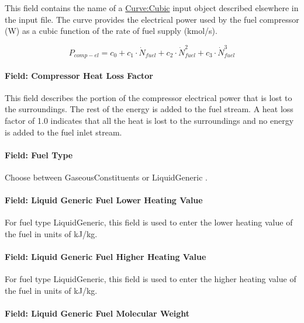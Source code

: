 This field contains the name of a \hyperref[curvecubic]{Curve:Cubic} input object described elsewhere in the input file. The curve provides the electrical power used by the fuel compressor (W) as a cubic function of the rate of fuel supply (kmol/s).

\begin{equation}
{P_{comp - el}} = {c_0} + {c_1} \cdot {\dot N_{fuel}} + {c_2} \cdot \dot N_{fuel}^2 + {c_3} \cdot \dot N_{fuel}^3
\end{equation}

\paragraph{Field: Compressor Heat Loss Factor}\label{field-compressor-heat-loss-factor}

This field describes the portion of the compressor electrical power that is lost to the surroundings. The rest of the energy is added to the fuel stream. A heat loss factor of 1.0 indicates that all the heat is lost to the surroundings and no energy is added to the fuel inlet stream.

\paragraph{Field: Fuel Type}\label{field-fuel-type-3}

Choose between GaseousConstituents or LiquidGeneric .

\paragraph{Field: Liquid Generic Fuel Lower Heating Value}\label{field-liquid-generic-fuel-lower-heating-value}

For fuel type LiquidGeneric, this field is used to enter the lower heating value of the fuel in units of kJ/kg.

\paragraph{Field: Liquid Generic Fuel Higher Heating Value}\label{field-liquid-generic-fuel-higher-heating-value}

For fuel type LiquidGeneric, this field is used to enter the higher heating value of the fuel in units of kJ/kg.

\paragraph{Field: Liquid Generic Fuel Molecular Weight}\label{field-liquid-generic-fuel-molecular-weight}

